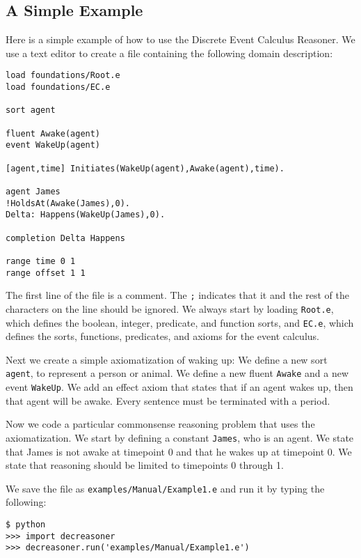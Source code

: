 \documentclass{article}
\begin{document}
\subsection{A Simple Example}

Here is a simple example of how to use the Discrete Event Calculus Reasoner.
We use a text editor to create a file containing the following domain
description:
\begin{verbatim}
load foundations/Root.e
load foundations/EC.e

sort agent

fluent Awake(agent)
event WakeUp(agent)

[agent,time] Initiates(WakeUp(agent),Awake(agent),time).

agent James
!HoldsAt(Awake(James),0).
Delta: Happens(WakeUp(James),0).

completion Delta Happens

range time 0 1
range offset 1 1
\end{verbatim}
The first line of the file is a comment. The {\tt ;} indicates that it
and the rest of the characters on the line should be ignored.
We always start by loading {\tt Root.e}, which defines the boolean,
integer, predicate, and function sorts, and {\tt EC.e}, which defines
the sorts, functions, predicates, and axioms for the event calculus.

Next we create a simple axiomatization of waking up: We define a new
sort {\tt agent}, to represent a person or animal. We define a new
fluent {\tt Awake} and a new event {\tt WakeUp}.  We add an effect
axiom that states that if an agent wakes up, then that agent will be
awake. Every sentence must be terminated with a period.

Now we code a particular commonsense reasoning problem that uses the
axiomatization. We start by defining a constant {\tt James}, who is an
agent. We state that James is not awake at timepoint 0 and that he
wakes up at timepoint 0. We state that reasoning should be limited to
timepoints 0 through 1.

We save the file as {\tt examples/Manual/Example1.e} and run it by typing
the following:
\begin{verbatim}
$ python
>>> import decreasoner
>>> decreasoner.run('examples/Manual/Example1.e')
\end{verbatim}
\end{document}
